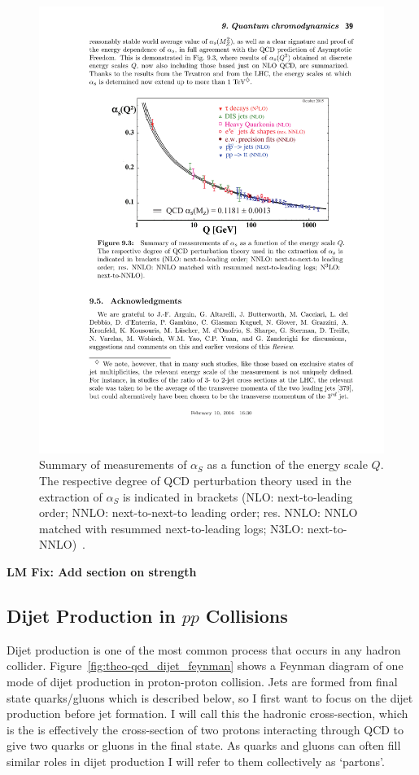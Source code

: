 \begin{figure}[!hbt]
  \begin{center}
    \includegraphics[width=0.7\linewidth, angle=0]{figs/Theory/qcd_running.pdf}
  \end{center}
  \caption[Summary of measurements of $\alpha_S$ as a function of the energy scale $Q$.
    The respective degree of QCD perturbation theory used in the extraction of $\alpha_S$ is indicated in brackets
    (NLO: next-to-leading order; NNLO: next-to-next-to leading order; res. NNLO: NNLO matched with resummed next-to-leading logs; N3LO: next-to-NNLO).]
          {Summary of measurements of $\alpha_S$ as a function of the energy scale $Q$.
            The respective degree of QCD perturbation theory used in the extraction of $\alpha_S$ is indicated in brackets
            (NLO: next-to-leading order; NNLO: next-to-next-to leading order; res. NNLO: NNLO matched with resummed next-to-leading logs; N3LO: next-to-NNLO)~\cite{theo-qcd}.}
  \label{fig:theo-qcd_running}
\end{figure}

\textbf{LM Fix: Add section on strength}

\subsection{Dijet Production in $pp$ Collisions}

Dijet production is one of the most common process that occurs in any hadron collider.
Figure~\ref{fig:theo-qcd_dijet_feynman} shows a Feynman diagram of one mode of dijet production in proton-proton collision.
Jets are formed from final state quarks/gluons which is described below, so I first want to focus on the dijet production before jet formation.
I will call this the hadronic cross-section,
which is the is effectively the cross-section of two protons interacting through QCD to give two quarks or gluons in the final state.
As quarks and gluons can often fill similar roles in dijet production I will refer to them collectively as `partons'.

